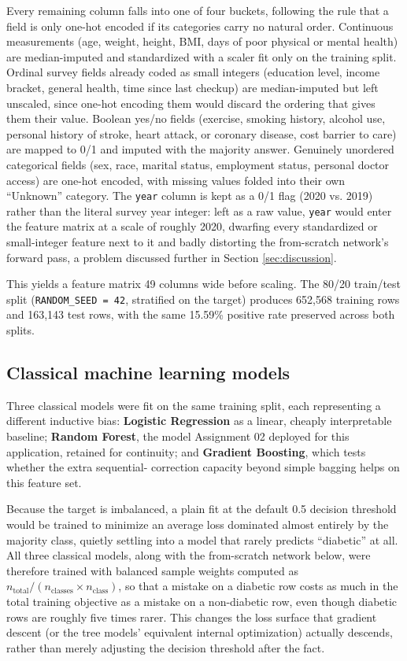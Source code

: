 \documentclass[11pt]{article}
\newcommand{\model}[1]{\textbf{#1}}
\begin{document}
Every remaining column falls into one of four buckets, following the rule that a field is
only one-hot encoded if its categories carry no natural order. Continuous measurements
(age, weight, height, BMI, days of poor physical or mental health) are median-imputed and
standardized with a scaler fit only on the training split. Ordinal survey fields already
coded as small integers (education level, income bracket, general health, time since last
checkup) are median-imputed but left unscaled, since one-hot encoding them would discard
the ordering that gives them their value. Boolean yes/no fields (exercise, smoking history,
alcohol use, personal history of stroke, heart attack, or coronary disease, cost barrier to
care) are mapped to 0/1 and imputed with the majority answer. Genuinely unordered
categorical fields (sex, race, marital status, employment status, personal doctor access)
are one-hot encoded, with missing values folded into their own ``Unknown'' category. The
\verb|year| column is kept as a 0/1 flag (2020 vs. 2019) rather than the literal survey
year integer: left as a raw value, \verb|year| would enter the feature matrix at a scale
of roughly 2020, dwarfing every standardized or small-integer feature next to it and badly
distorting the from-scratch network's forward pass, a problem discussed further in Section
\ref{sec:discussion}.

This yields a feature matrix 49 columns wide before scaling. The 80/20 train/test split
(\texttt{RANDOM\_SEED = 42}, stratified on the target) produces 652,568 training rows and
163,143 test rows, with the same 15.59\% positive rate preserved across both splits.

\subsection{Classical machine learning models}

Three classical models were fit on the same training split, each representing a different
inductive bias: \model{Logistic Regression} as a linear, cheaply interpretable baseline;
\model{Random Forest}, the model Assignment 02 deployed for this application, retained for
continuity; and \model{Gradient Boosting}, which tests whether the extra sequential-
correction capacity beyond simple bagging helps on this feature set.

Because the target is imbalanced, a plain fit at the default 0.5 decision threshold would
be trained to minimize an average loss dominated almost entirely by the majority class,
quietly settling into a model that rarely predicts ``diabetic'' at all. All three classical
models, along with the from-scratch network below, were therefore trained with balanced
sample weights computed as $n_{\text{total}} / (n_{\text{classes}} \times n_{\text{class}})$,
so that a mistake on a diabetic row costs as much in the total training objective as a
mistake on a non-diabetic row, even though diabetic rows are roughly five times rarer. This
changes the loss surface that gradient descent (or the tree models' equivalent internal
optimization) actually descends, rather than merely adjusting the decision threshold after
the fact.
\end{document}
